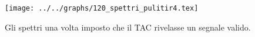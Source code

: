 \begin{figure}[h] \centering\texttt{[image: ../../graphs/120\_spettri\_pulitir4.tex]}\caption{Gli spettri una volta imposto che il TAC rivelasse un segnale valido. }\label{gr:120_spettri_pulitir4} \end{figure}
